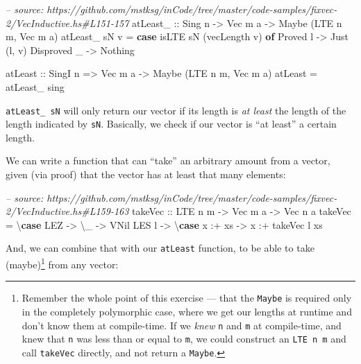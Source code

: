 \documentclass[]{article}
\newenvironment{Shaded}{}{}
\newcommand{\KeywordTok}[1]{\textcolor[rgb]{0.00,0.44,0.13}{\textbf{#1}}}
\newcommand{\DataTypeTok}[1]{\textcolor[rgb]{0.56,0.13,0.00}{#1}}
\newcommand{\CommentTok}[1]{\textcolor[rgb]{0.38,0.63,0.69}{\textit{#1}}}
\newcommand{\OtherTok}[1]{\textcolor[rgb]{0.00,0.44,0.13}{#1}}
\newcommand{\FunctionTok}[1]{\textcolor[rgb]{0.02,0.16,0.49}{#1}}
\newcommand{\NormalTok}[1]{#1}
\begin{document}
\begin{Shaded}
\begin{Highlighting}[]
\CommentTok{-- source: https://github.com/mstksg/inCode/tree/master/code-samples/fixvec-2/VecInductive.hs#L151-157}
\OtherTok{atLeast_ ::} \DataTypeTok{Sing}\NormalTok{ n }\OtherTok{->} \DataTypeTok{Vec}\NormalTok{ m a }\OtherTok{->} \DataTypeTok{Maybe}\NormalTok{ (}\DataTypeTok{LTE}\NormalTok{ n m, }\DataTypeTok{Vec}\NormalTok{ m a)}
\NormalTok{atLeast_ sN v }\FunctionTok{=} \KeywordTok{case}\NormalTok{ isLTE sN (vecLength v) }\KeywordTok{of}
    \DataTypeTok{Proved}\NormalTok{ l    }\OtherTok{->} \DataTypeTok{Just}\NormalTok{ (l, v)}
    \DataTypeTok{Disproved}\NormalTok{ _ }\OtherTok{->} \DataTypeTok{Nothing}

\OtherTok{atLeast ::} \DataTypeTok{SingI}\NormalTok{ n }\OtherTok{=>} \DataTypeTok{Vec}\NormalTok{ m a }\OtherTok{->} \DataTypeTok{Maybe}\NormalTok{ (}\DataTypeTok{LTE}\NormalTok{ n m, }\DataTypeTok{Vec}\NormalTok{ m a)}
\NormalTok{atLeast }\FunctionTok{=}\NormalTok{ atLeast_ sing}
\end{Highlighting}
\end{Shaded}

\texttt{atLeast\_\ sN} will only return our vector if its length is \emph{at
least} the length of the length indicated by \texttt{sN}. Basically, we check if
our vector is ``at least'' a certain length.

We can write a function that can ``take'' an arbitrary amount from a vector,
given (via proof) that the vector has at least that many elements:

\begin{Shaded}
\begin{Highlighting}[]
\CommentTok{-- source: https://github.com/mstksg/inCode/tree/master/code-samples/fixvec-2/VecInductive.hs#L159-163}
\OtherTok{takeVec ::} \DataTypeTok{LTE}\NormalTok{ n m }\OtherTok{->} \DataTypeTok{Vec}\NormalTok{ m a }\OtherTok{->} \DataTypeTok{Vec}\NormalTok{ n a}
\NormalTok{takeVec }\FunctionTok{=}\NormalTok{ \textbackslash{}}\KeywordTok{case}
    \DataTypeTok{LEZ}   \OtherTok{->}\NormalTok{ \textbackslash{}_ }\OtherTok{->} \DataTypeTok{VNil}
    \DataTypeTok{LES}\NormalTok{ l }\OtherTok{->}\NormalTok{ \textbackslash{}}\KeywordTok{case}
\NormalTok{      x }\FunctionTok{:+}\NormalTok{ xs }\OtherTok{->}\NormalTok{ x }\FunctionTok{:+}\NormalTok{ takeVec l xs}
\end{Highlighting}
\end{Shaded}

And, we can combine that with our \texttt{atLeast} function, to be able to take
(maybe)\footnote{Remember the whole point of this exercise --- that the
  \texttt{Maybe} is required only in the completely polymorphic case, where we
  get our lengths at runtime and don't know them at compile-time. If we
  \emph{knew} \texttt{n} and \texttt{m} at compile-time, and knew that
  \texttt{n} was less than or equal to \texttt{m}, we could construct an
  \texttt{LTE\ n\ m} and call \texttt{takeVec} directly, and not return a
  \texttt{Maybe}.} from any vector:
\end{document}
